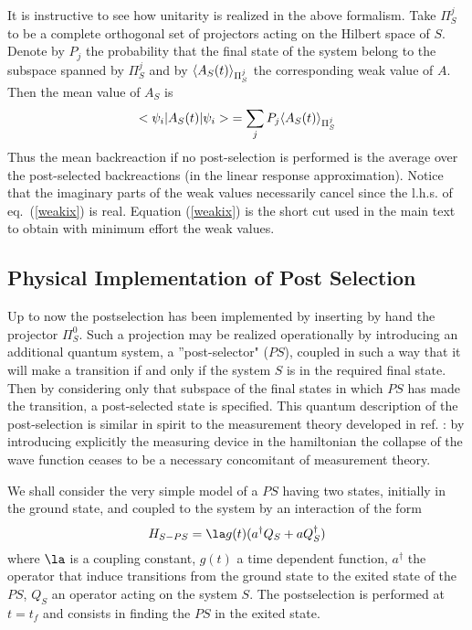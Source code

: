 It is instructive to see how unitarity is realized in the above formalism.
Take
 $\Pi^j_S$
to be  a
complete orthogonal set of projectors acting on the
Hilbert space of $S$. Denote by $P_j$ the probability that
the final state of the system belong to the subspace spanned by $\Pi^j_S$ and
by $\mbox{$ \langle A_{S}(t) \rangle $}_{\Pi^j_S} $ the corresponding weak
value of $A$. Then the mean value of
$A_S$ is  \begin{equation} \mbox{$ \mbox{$ < \psi_i \vert $} $} A_S(t) \mbox{$ \mbox{$ \vert \psi_i > $} $} =
\sum_j P_j \mbox{$ \langle A_{S}(t) \rangle $}_{\Pi^j_S}
  \label{weakix}
\end{equation}
Thus the mean
backreaction if no post-selection is performed is the average over the
post-selected backreactions (in the linear response approximation).
Notice that the imaginary parts of the weak
values necessarily cancel since the l.h.s. of eq.~(\ref{weakix}) is
real. Equation (\ref{weakix}) is the short cut used in the main text to
obtain with minimum effort the weak values.

\subsection{Physical Implementation of Post Selection}

Up to now the postselection has been implemented by
inserting by hand
the projector $\Pi^0_S$.
Such a projection may be
realized operationally by introducing
an additional
quantum
system, a ''post-selector" ($PS$),
coupled in such a way
 that it will make a transition if and only if the system $S$
is in the required final state. Then by considering
only that subspace of the
final states in which $PS$ has made the
transition, a post-selected state is specified. This
quantum description of the
post-selection
is similar in spirit to the measurement theory developed in ref.
\cite{Vonn}: by introducing explicitly the measuring device in the
hamiltonian the collapse of the wave function ceases to be a necessary
concomitant of measurement theory.

We shall consider the very simple model of a $PS$ having two states,
initially in the ground state, and coupled to the system by an interaction
of the form \begin{equation}
H_{S-PS} = \la g(t) ( a^\dagger Q_S + a Q_S^\dagger)
\label{weakx}
\end{equation}
where $\la$ is a
coupling constant, $g(t)$ a time dependent function, $a^\dagger$  the operator
that induce transitions from the ground state to the exited state of the
$PS$, $Q_S$ an operator acting on the system $S$. The
postselection is performed at $t=t_f$ and consists in finding the $PS$ in the
exited state.

